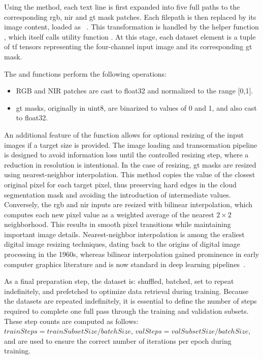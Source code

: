 {Using the  method, each text line is first expanded into five full paths to the corresponding \gls{rgb}, \gls{nir} and \gls{gt} mask patches.
Each filepath is then replaced by its image content, loaded as ~\cite{tfTensor}.
This transformation is handled by the helper function , which itself calls utility function .
At this stage, each dataset element is a tuple of \gls{tf} tensors representing the four-channel input image and its corresponding \gls{gt} mask.

The  and  functions perform the following operations:

\begin{itemize}
    \item RGB and NIR patches are cast to \gls{float32} and normalized to the range [0,1].
    \item \gls{gt} masks, originally in \gls{uint8}, are binarized to values of 0 and 1, and also cast to \gls{float32}.
\end{itemize}

An additional feature of the  function allows for optional resizing of the input images if a target size is provided.
The image loading and transormation pipeline is designed to avoid information loss until the controlled resizing step, where a reduction in resolution is intentional.
In the case of resizing, \gls{gt} masks are resized using nearest-neighbor interpolation. This method copies the value of the closest original pixel for each target pixel,
thus preserving hard edges in the cloud segmentation mask and avoiding the introduction of intermediate values.
Conversely, the \gls{rgb} and \gls{nir} inputs are resized with bilinear interpolation,
which computes each new pixel value as a weighted average of the nearest $2\times2$ neighborhood. This results in smooth pixel transitions while maintaining important image details.
Nearest-neighbor interpolation is among the eraliest digital image resizing techniques, dating back to the origins of digital image processing in the 1960s,
whereas bilinear interpolation gained prominence in early computer graphics literature and is now standard in deep learning pipelines~\cite{bilinearNearest1, bilinearNearest2}.

As a final preparation step, the dataset is: shuffled, batched, set to repeat indefinitely,
and prefetched to optimize data retrieval during training.
Because the datasets are repeated indefinitely, it is essential to define the number of steps required to complete one full pass through the training and validation subsets.
These step counts are computed as follows: \ensuremath{trainSteps = trainSubsetSize / batchSize}, \ensuremath{valSteps = valSubsetSize / batchSize},
and are used to ensure the correct number of iterations per epoch during training.

}
